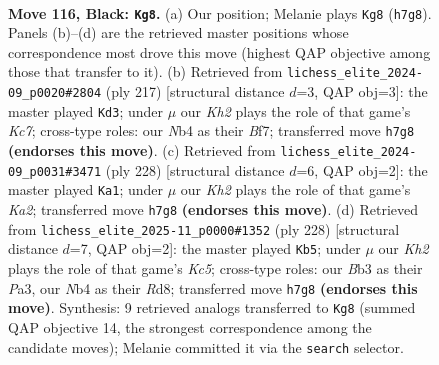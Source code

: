 \documentclass[11pt]{article}
\begin{document}
\clearpage

\begin{figure}[p]\centering
\begin{subfigure}{0.46\textwidth}\centering
\resizebox{\linewidth}{!}{%
\newchessgame
\chessboard[
  setfen={8/7k/8/7K/1n1B4/1b6/5P2/8 b - - 78 116},
  showmover=false,
  pgfstyle=straightmove, color=movearrow, markmove={h7-g8}
]}
\caption{}
\end{subfigure}\hfill
\begin{subfigure}{0.46\textwidth}\centering
\resizebox{\linewidth}{!}{%
\newchessgame
\chessboard[
  setfen={8/5b2/5P2/8/1K1B4/8/2k5/8 b - - 32 109},
  showmover=false,
  pgfstyle=straightmove, color=movearrow, markmove={c2-d3}
]}
\caption{}
\end{subfigure}
\\[4pt]
\begin{subfigure}{0.46\textwidth}\centering
\resizebox{\linewidth}{!}{%
\newchessgame
\chessboard[
  setfen={8/8/p7/8/1k6/3b4/K7/8 w - - 40 115},
  showmover=false,
  pgfstyle=straightmove, color=movearrow, markmove={a2-a1}
]}
\caption{}
\end{subfigure}\hfill
\begin{subfigure}{0.46\textwidth}\centering
\resizebox{\linewidth}{!}{%
\newchessgame
\chessboard[
  setfen={3R4/1k6/8/2K5/p7/P7/2b5/8 w - - 31 115},
  showmover=false,
  pgfstyle=straightmove, color=movearrow, markmove={c5-b5}
]}
\caption{}
\end{subfigure}
\caption{\textbf{Move 116, Black: \texttt{Kg8}.} (a) Our position; Melanie plays \texttt{Kg8} (\texttt{h7g8}). Panels (b)--(d) are the retrieved master positions whose correspondence most drove this move (highest QAP objective among those that transfer to it). (b) Retrieved from \texttt{lichess\_elite\_2024-09\_p0020\#2804} (ply 217) [structural distance $d$=3, QAP obj=3]: the master played \texttt{Kd3}; under $\mu$ our \emph{Kh2} plays the role of that game's \emph{Kc7}; cross-type roles: our \emph{N}b4 as their \emph{B}f7; transferred move \texttt{h7g8} \textbf{(endorses this move)}. (c) Retrieved from \texttt{lichess\_elite\_2024-09\_p0031\#3471} (ply 228) [structural distance $d$=6, QAP obj=2]: the master played \texttt{Ka1}; under $\mu$ our \emph{Kh2} plays the role of that game's \emph{Ka2}; transferred move \texttt{h7g8} \textbf{(endorses this move)}. (d) Retrieved from \texttt{lichess\_elite\_2025-11\_p0000\#1352} (ply 228) [structural distance $d$=7, QAP obj=2]: the master played \texttt{Kb5}; under $\mu$ our \emph{Kh2} plays the role of that game's \emph{Kc5}; cross-type roles: our \emph{B}b3 as their \emph{P}a3, our \emph{N}b4 as their \emph{R}d8; transferred move \texttt{h7g8} \textbf{(endorses this move)}. Synthesis: 9 retrieved analogs transferred to \texttt{Kg8} (summed QAP objective 14, the strongest correspondence among the candidate moves); Melanie committed it via the \texttt{search} selector.}
\label{fig:thought-m231}
\end{figure}
\end{document}
